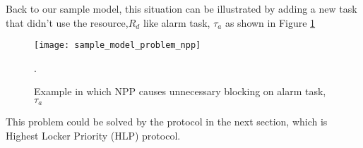 Back to our sample model, this situation can be illustrated by adding a new task that didn't use the resource,$ R_{d}$ like alarm task, $\tau_{a}$ as shown in Figure \ref{fig:sample_model_problem_npp}

 
\begin{figure}[ht]
    \centering
    \texttt{[image: sample\_model\_problem\_npp]}
    \caption{Example in which NPP causes unnecessary blocking on alarm task, $ \tau_{a} $ }.
    \label{fig:sample_model_problem_npp}
\end{figure}

 This problem could be solved by the protocol in the next section, which is Highest Locker Priority (HLP) protocol.